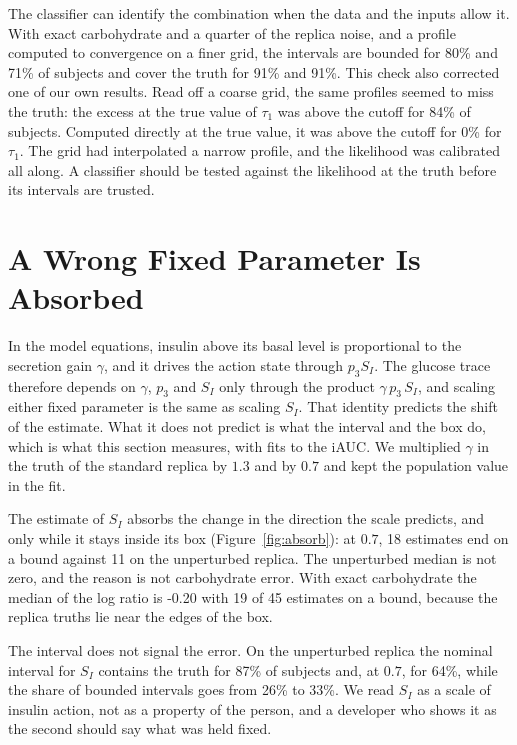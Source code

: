 \documentclass[letterpaper]{article} %
\newcommand{\figAbsorbMedianExact}{-0.20}
\newcommand{\figAbsorbNExact}{45}
\newcommand{\figAbsorbPinnedExact}{19}
\newcommand{\figAbsorbPinnedOne}{11}
\newcommand{\figAbsorbPinnedZeroSeven}{18}
\newcommand{\resConvFinePBounded}{71}
\newcommand{\resConvFinePCover}{91}
\newcommand{\resConvFineTauBounded}{80}
\newcommand{\resConvFineTauCover}{91}
\newcommand{\resPertBaseSIBounded}{26}
\newcommand{\resPertBaseSICover}{87}
\newcommand{\resPertGammaDownSIBounded}{33}
\newcommand{\resPertGammaDownSICover}{64}
\newcommand{\resTruthQuarterTauDirectOver}{0}
\newcommand{\resTruthQuarterTauStoredOver}{84}
\begin{document}
The classifier can identify the combination when the data and the inputs allow it. With exact carbohydrate and a quarter of the replica noise, and a profile computed to convergence on a finer grid, the intervals are bounded for \resConvFineTauBounded\% and \resConvFinePBounded\% of subjects and cover the truth for \resConvFineTauCover\% and \resConvFinePCover\%. This check also corrected one of our own results. Read off a coarse grid, the same profiles seemed to miss the truth: the excess at the true value of $\tau_1$ was above the cutoff for \resTruthQuarterTauStoredOver\% of subjects. Computed directly at the true value, it was above the cutoff for \resTruthQuarterTauDirectOver\% for $\tau_1$. The grid had interpolated a narrow profile, and the likelihood was calibrated all along. A classifier should be tested against the likelihood at the truth before its intervals are trusted.

\section{A Wrong Fixed Parameter Is Absorbed}\label{sec:absorb}

In the model equations, insulin above its basal level is proportional to the secretion gain $\gamma$, and it drives the action state through $p_3 S_I$. The glucose trace therefore depends on $\gamma$, $p_3$ and $S_I$ only through the product $\gamma\,p_3\,S_I$, and scaling either fixed parameter is the same as scaling $S_I$. That identity predicts the shift of the estimate. What it does not predict is what the interval and the box do, which is what this section measures, with fits to the iAUC. We multiplied $\gamma$ in the truth of the standard replica by $1.3$ and by $0.7$ and kept the population value in the fit.

The estimate of $S_I$ absorbs the change in the direction the scale predicts, and only while it stays inside its box (Figure~\ref{fig:absorb}): at $0.7$, \figAbsorbPinnedZeroSeven{} estimates end on a bound against \figAbsorbPinnedOne{} on the unperturbed replica. The unperturbed median is not zero, and the reason is not carbohydrate error. With exact carbohydrate the median of the log ratio is \figAbsorbMedianExact{} with \figAbsorbPinnedExact{} of \figAbsorbNExact{} estimates on a bound, because the replica truths lie near the edges of the box.

The interval does not signal the error. On the unperturbed replica the nominal interval for $S_I$ contains the truth for \resPertBaseSICover\% of subjects and, at $0.7$, for \resPertGammaDownSICover\%, while the share of bounded intervals goes from \resPertBaseSIBounded\% to \resPertGammaDownSIBounded\%. We read $S_I$ as a scale of insulin action, not as a property of the person, and a developer who shows it as the second should say what was held fixed.
\end{document}
